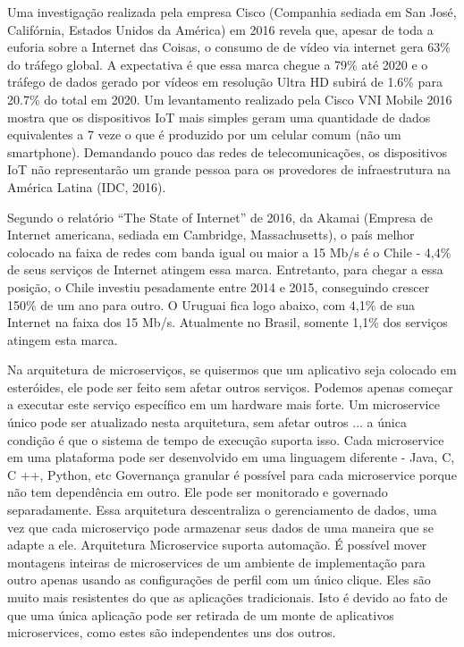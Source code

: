 Uma investigação realizada pela empresa Cisco (Companhia sediada em San José, Califórnia, Estados Unidos da América) em 2016 revela que, apesar de toda a euforia sobre a Internet das Coisas, o consumo de de vídeo via internet gera 63\% do tráfego global. A expectativa é que essa marca chegue a 79\% até 2020 e o tráfego de dados gerado por vídeos em resolução Ultra HD subirá de 1.6\% para 20.7\% do total em 2020. Um levantamento realizado pela Cisco VNI Mobile 2016 mostra que os dispositivos IoT mais simples geram uma quantidade de dados equivalentes a 7 veze o que é produzido por um celular comum (não um smartphone). Demandando pouco das redes de telecomunicações, os dispositivos IoT não representarão um grande pessoa para os provedores de infraestrutura na América Latina (IDC, 2016). 

Segundo o relatório “The State of Internet” de 2016, da Akamai (Empresa de Internet americana, sediada em Cambridge, Massachusetts), o país melhor colocado na faixa de redes com banda igual ou maior a 15 Mb/s é o Chile - 4,4\% de seus serviços de Internet atingem essa marca. Entretanto, para chegar a essa posição, o Chile investiu pesadamente entre 2014 e 2015, conseguindo crescer 150\% de um ano para outro. O Uruguai fica logo abaixo, com 4,1\% de sua Internet na faixa dos 15 Mb/s. Atualmente no Brasil, somente 1,1\% dos serviços atingem esta marca.

Na arquitetura de microserviços, se quisermos que um aplicativo seja colocado em esteróides, ele pode ser feito sem afetar outros serviços. Podemos apenas começar a executar este serviço específico em um hardware mais forte. Um microservice único pode ser atualizado nesta arquitetura, sem afetar outros ... a única condição é que o sistema de tempo de execução suporta isso. Cada microservice em uma plataforma pode ser desenvolvido em uma linguagem diferente - Java, C, C ++, Python, etc Governança granular é possível para cada microservice porque não tem dependência em outro. Ele pode ser monitorado e governado separadamente. Essa arquitetura descentraliza o gerenciamento de dados, uma vez que cada microserviço pode armazenar seus dados de uma maneira que se adapte a ele. Arquitetura Microservice suporta automação. É possível mover montagens inteiras de microservices de um ambiente de implementação para outro apenas usando as configurações de perfil com um único clique. Eles são muito mais resistentes do que as aplicações tradicionais. Isto é devido ao fato de que uma única aplicação pode ser retirada de um monte de aplicativos microservices, como estes são independentes uns dos outros.

